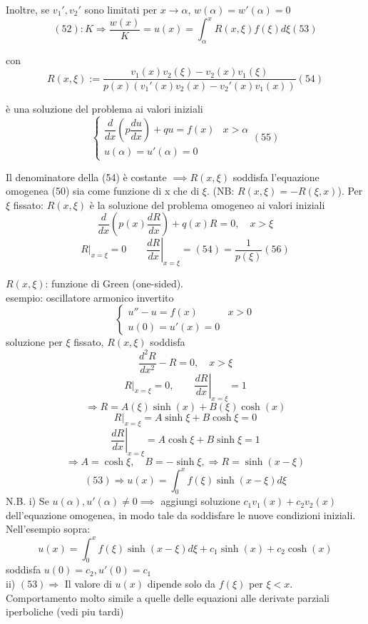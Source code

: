 \documentclass[a4paper,11pt]{report}
\begin{document}
Inoltre, se $v_1',v_2'$ sono limitati per $x\to\alpha$, $w(\alpha)=w'(\alpha)=0$
\begin{equation}
(52):K \Rightarrow \dfrac{w(x)}{K}=u(x)=\int_\alpha^xR(x,\xi)f(\xi)d\xi (53)
\end{equation}

con 
\begin{equation}
R(x,\xi):=\dfrac{v_1(x)v_2(\xi)-v_2(x)v_1(\xi)}{p(x)(v_1'(x)v_2(x)-v_2'(x)v_1(x))} (54)
\end{equation}

è una soluzione del problema ai valori iniziali
\begin{equation}
\left\{\begin{matrix}
\dfrac{d}{dx}\left(p\dfrac{du}{dx}\right) + qu=f(x) & x>\alpha\\
u(\alpha)=u'(\alpha)=0 &
\end{matrix}\right. (55)
\end{equation}

Il denominatore della (54) è costante $\implies R(x,\xi)$ soddisfa l'equazione omogenea (50) sia come funzione di x che di $\xi$. (NB: $R(x,\xi)=-R(\xi,x)$). Per $\xi$ fissato: $R(x,\xi)$ è la soluzione del problema omogeneo ai valori iniziali
$$
\dfrac{d}{dx}\left(p(x)\dfrac{dR}{dx}\right) + q(x)R=0, \quad x>\xi
$$
\begin{equation}
R |_{x=\xi}=0 \qquad \left.\dfrac{dR}{dx}\right|_{x=\xi}=(54)=\dfrac{1}{p(\xi)} (56)
\end{equation}

$R(x,\xi)$: funzione di Green (one-sided).\\
esempio: oscillatore armonico invertito
$$
\left\{\begin{matrix}
u'' - u =f(x) & x>0 \\
u(0)=u'(x)=0&
\end{matrix}\right.
$$
soluzione per $\xi$ fissato, $R(x,\xi)$ soddisfa 
$$
\dfrac{d^2R}{dx^2}-R=0, \quad x>\xi
$$
$$
R|_{x=\xi}=0, \qquad \left.\dfrac{dR}{dx}\right|_{x=\xi}=1
$$
$$
\Rightarrow R= A(\xi)\sinh(x)+B(\xi)\cosh(x)
$$
$$
R|_{x=\xi}=A\sinh\xi + B \cosh \xi =0
$$
$$
\left.\dfrac{dR}{dx}\right|_{x=\xi}=A\cosh\xi + B \sinh \xi =1
$$
$$
\Rightarrow A=\cosh \xi, \quad B=-\sinh \xi, \Rightarrow R=\sinh(x-\xi)
$$
$$
(53)\Rightarrow u(x)=\int_0^x f(\xi)\sinh(x-\xi)d\xi
$$
N.B. 
i) Se $u(\alpha),u'(\alpha)\neq 0 \implies$ aggiungi soluzione $c_1v_1(x)+c_2v_2(x)$ dell'equazione omogenea, in modo tale da soddisfare le nuove condizioni iniziali. Nell'esempio sopra:
$$
u(x)=\int_0^x f(\xi)\sinh(x-\xi)d\xi + c_1\sinh(x)+ c_2\cosh(x)
$$
soddisfa $u(0)=c_2,u'(0)=c_1$\\
ii) $(53)\Rightarrow$ Il valore di $u(x)$ dipende solo da $f(\xi)$ per  $\xi<x$. Comportamento molto simile a quelle delle equazioni alle derivate parziali iperboliche (vedi piu tardi) %
\end{document}
